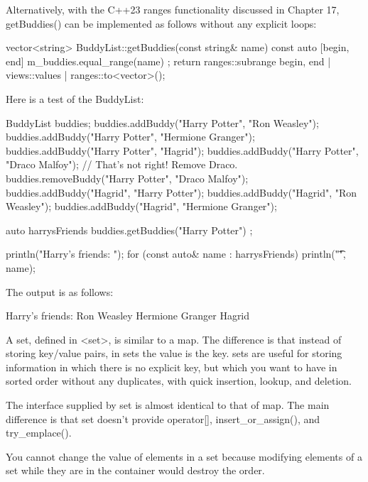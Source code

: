 Alternatively, with the C++23 ranges functionality discussed in Chapter 17, getBuddies() can be implemented as follows without any explicit loops:

\begin{cpp}
vector<string> BuddyList::getBuddies(const string& name) const
{
    auto [begin, end] { m_buddies.equal_range(name) };
    return ranges::subrange { begin, end } | views::values | ranges::to<vector>();
}
\end{cpp}

Here is a test of the BuddyList:

\begin{cpp}
BuddyList buddies;
buddies.addBuddy("Harry Potter", "Ron Weasley");
buddies.addBuddy("Harry Potter", "Hermione Granger");
buddies.addBuddy("Harry Potter", "Hagrid");
buddies.addBuddy("Harry Potter", "Draco Malfoy");
// That's not right! Remove Draco.
buddies.removeBuddy("Harry Potter", "Draco Malfoy");
buddies.addBuddy("Hagrid", "Harry Potter");
buddies.addBuddy("Hagrid", "Ron Weasley");
buddies.addBuddy("Hagrid", "Hermione Granger");

auto harrysFriends { buddies.getBuddies("Harry Potter") };

println("Harry's friends: ");
for (const auto& name : harrysFriends) {
    println("\t{}", name);
}
\end{cpp}

The output is as follows:

\begin{shell}
Harry's friends:
        Ron Weasley
        Hermione Granger
        Hagrid
\end{shell}


A set, defined in <set>, is similar to a map. The difference is that instead of storing key/value pairs, in sets the value is the key. sets are useful for storing information in which there is no explicit key, but which you want to have in sorted order without any duplicates, with quick insertion, lookup, and deletion.

The interface supplied by set is almost identical to that of map. The main difference is that set doesn’t provide operator[], insert\_or\_assign(), and try\_emplace().

You cannot change the value of elements in a set because modifying elements of a set while they are in the container would destroy the order.


